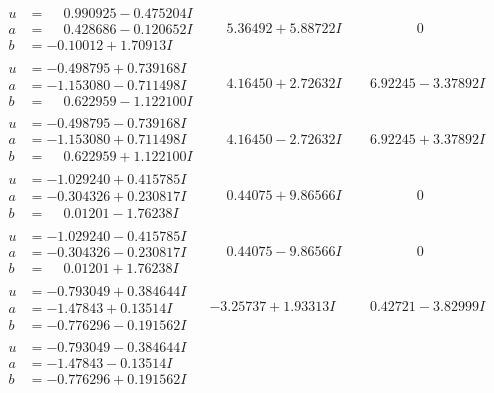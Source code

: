 \documentclass[1p]{elsarticle_modified}
\theoremstyle{definition}
\begin{document}
$$\begin{array}{c|c|c}
\begin{aligned}
u &= \phantom{-}0.990925 - 0.475204 I \\
a &= \phantom{-}0.428686 - 0.120652 I \\
b &= -0.10012 + 1.70913 I\end{aligned}
 & \phantom{-}5.36492 + 5.88722 I & \phantom{-0.000000 } 0 \\ \hline\begin{aligned}
u &= -0.498795 + 0.739168 I \\
a &= -1.153080 - 0.711498 I \\
b &= \phantom{-}0.622959 - 1.122100 I\end{aligned}
 & \phantom{-}4.16450 + 2.72632 I & \phantom{-}6.92245 - 3.37892 I \\ \hline\begin{aligned}
u &= -0.498795 - 0.739168 I \\
a &= -1.153080 + 0.711498 I \\
b &= \phantom{-}0.622959 + 1.122100 I\end{aligned}
 & \phantom{-}4.16450 - 2.72632 I & \phantom{-}6.92245 + 3.37892 I \\ \hline\begin{aligned}
u &= -1.029240 + 0.415785 I \\
a &= -0.304326 + 0.230817 I \\
b &= \phantom{-}0.01201 - 1.76238 I\end{aligned}
 & \phantom{-}0.44075 + 9.86566 I & \phantom{-0.000000 } 0 \\ \hline\begin{aligned}
u &= -1.029240 - 0.415785 I \\
a &= -0.304326 - 0.230817 I \\
b &= \phantom{-}0.01201 + 1.76238 I\end{aligned}
 & \phantom{-}0.44075 - 9.86566 I & \phantom{-0.000000 } 0 \\ \hline\begin{aligned}
u &= -0.793049 + 0.384644 I \\
a &= -1.47843 + 0.13514 I \\
b &= -0.776296 - 0.191562 I\end{aligned}
 & -3.25737 + 1.93313 I & \phantom{-}0.42721 - 3.82999 I \\ \hline\begin{aligned}
u &= -0.793049 - 0.384644 I \\
a &= -1.47843 - 0.13514 I \\
b &= -0.776296 + 0.191562 I\end{aligned}

\end{array}$$
\end{document}
